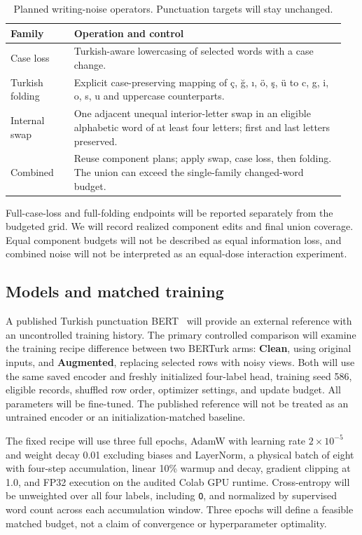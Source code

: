 \documentclass{article}
\begin{document}
\begin{table}[t]
\caption{Planned writing-noise operators. Punctuation targets will stay unchanged.}
\label{tab:noise}
\centering
\small
\begin{tabular}{@{}p{0.18\linewidth}p{0.77\linewidth}@{}}
\toprule
Family & Operation and control \\
\midrule
Case loss & Turkish-aware lowercasing of selected words with a case change. \\
Turkish folding & Explicit case-preserving mapping of
\c{c}, \u{g}, \i, \"{o}, \c{s}, \"{u} to c, g, i, o, s, u and uppercase counterparts. \\
Internal swap & One adjacent unequal interior-letter swap in an eligible
alphabetic word of at least four letters; first and last letters preserved. \\
Combined & Reuse component plans; apply swap, case loss, then folding.
The union can exceed the single-family changed-word budget. \\
\bottomrule
\end{tabular}
\end{table}

Full-case-loss and full-folding endpoints will be reported separately from the
budgeted grid. We will record realized component edits and final union coverage.
Equal component budgets will not be described as equal information loss, and
combined noise will not be interpreted as an equal-dose interaction experiment.

\subsection{Models and matched training}
A published Turkish punctuation BERT~\cite{kurt2023} will provide an external
reference with an uncontrolled training history. The primary controlled
comparison will examine the training recipe difference between two
BERTurk arms: \textbf{Clean}, using original inputs, and \textbf{Augmented},
replacing selected rows with noisy views. Both will use the same saved encoder
and freshly initialized four-label head, training seed 586, eligible records,
shuffled row order, optimizer settings, and update budget. All parameters will
be fine-tuned. The published reference will not be treated as an untrained
encoder or an initialization-matched baseline.

The fixed recipe will use three full epochs, AdamW with learning rate
$2\times10^{-5}$ and weight decay 0.01 excluding biases and LayerNorm,
a physical batch of eight with four-step accumulation, linear 10\% warmup and
decay, gradient clipping at 1.0, and FP32 execution on the audited Colab GPU
runtime. Cross-entropy will be unweighted over all four labels, including
\texttt{O}, and normalized by supervised word count across each accumulation
window. Three epochs will define a feasible matched budget, not a claim of
convergence or hyperparameter optimality.
\end{document}
